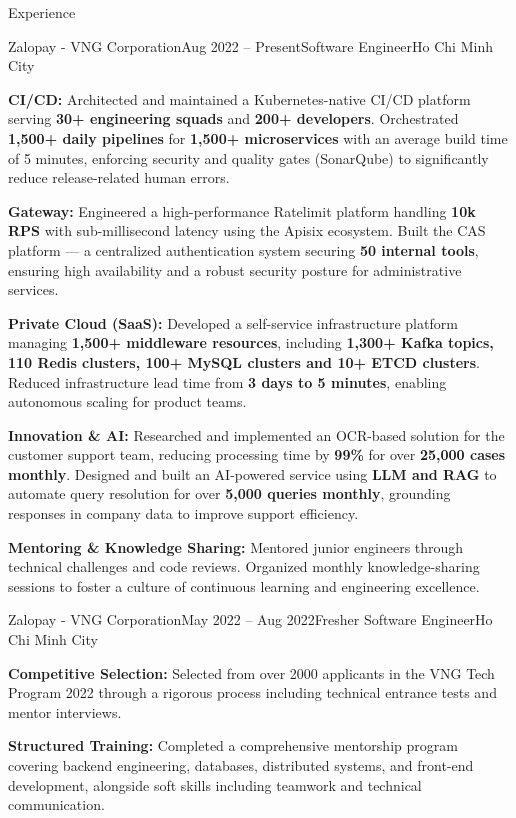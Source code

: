 \documentclass{resume} %
\begin{document}
\begin{rSection}{Experience}

    \begin{rSubsection}{Zalopay - VNG Corporation}{Aug 2022 -- Present}{Software Engineer}{Ho Chi Minh City}
        \item \textbf{CI/CD:} Architected and maintained a Kubernetes-native CI/CD platform serving \textbf{30+ engineering squads} and \textbf{200+ developers}. Orchestrated \textbf{1,500+ daily pipelines} for \textbf{1,500+ microservices} with an average build time of 5 minutes, enforcing security and quality gates (SonarQube) to significantly reduce release-related human errors.
        \item \textbf{Gateway:} Engineered a high-performance Ratelimit platform handling \textbf{10k RPS} with sub-millisecond latency using the Apisix ecosystem. Built the CAS platform — a centralized authentication system securing \textbf{50 internal tools}, ensuring high availability and a robust security posture for administrative services.
        \item \textbf{Private Cloud (SaaS):} Developed a self-service infrastructure platform managing \textbf{1,500+ middleware resources}, including \textbf{1,300+ Kafka topics, 110 Redis clusters, 100+ MySQL clusters and 10+ ETCD clusters}. Reduced infrastructure lead time from \textbf{3 days to 5 minutes}, enabling autonomous scaling for product teams.
        \item \textbf{Innovation \& AI:} Researched and implemented an OCR-based solution for the customer support team, reducing processing time by \textbf{99\%} for over \textbf{25,000 cases monthly}. Designed and built an AI-powered service using \textbf{LLM and RAG} to automate query resolution for over \textbf{5,000 queries monthly}, grounding responses in company data to improve support efficiency.
        \item \textbf{Mentoring \& Knowledge Sharing:} Mentored junior engineers through technical challenges and code reviews. Organized monthly knowledge-sharing sessions to foster a culture of continuous learning and engineering excellence.
    \end{rSubsection}


    \begin{rSubsection}{Zalopay - VNG Corporation}{May 2022 -- Aug 2022}{Fresher Software Engineer}{Ho Chi Minh City}

        \item \textbf{Competitive Selection:} Selected from over 2000 applicants in the VNG Tech Program 2022 through a rigorous process including technical entrance tests and mentor interviews.
        \item \textbf{Structured Training:} Completed a comprehensive mentorship program covering backend engineering, databases, distributed systems, and front-end development, alongside soft skills including teamwork and technical communication.

    \end{rSubsection}

\end{rSection}
\end{document}
